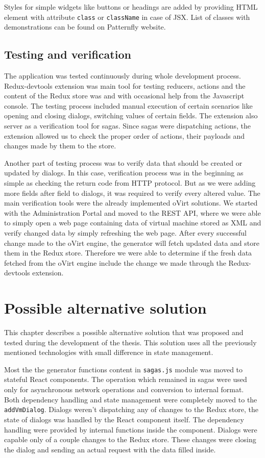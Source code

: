 Styles for simple widgets like buttons or headings are added by providing HTML element with attribute \texttt{class} or \texttt{className} in case of JSX. List of classes with demonstrations can be found on Patternfly website\cite{Patternfly}. 

\newpage
\section{Testing and verification}
The application was tested continuously during whole development process. Redux-devtools extension was main tool for testing reducers, actions and the content of the Redux store was and with occasional help from the Javascript console. The testing process included manual execution of certain scenarios like opening and closing dialogs, switching values of certain fields. The extension also server as a verification tool for sagas. Since sagas were dispatching actions, the extension allowed us to check the proper order of actions, their payloads and changes made by them to the store.

Another part of testing process was to verify data that should be created or updated by dialogs. In this case, verification process was in the beginning as simple as checking the return code from HTTP protocol. But as we were adding more fields after field to dialogs, it was required to verify every altered value. The main verification tools were the already implemented oVirt solutions. We started with the Administration Portal and moved to the REST API, where we were able to simply open a web page containing data of virtual machine stored as XML and verify changed data by simply refreshing the web page. After every successful change made to the oVirt engine, the generator will fetch updated data and store them in the Redux store. Therefore we were able to determine if the fresh data fetched from the oVirt engine include the change we made through the Redux-devtools extension.


\chapter{Possible alternative solution}
This chapter describes a possible alternative solution that was proposed and tested during the development of the thesis. This solution uses all the previously mentioned technologies with small difference in state management.

Most the the generator functions content in \texttt{sagas.js} module was moved to stateful React components. The operation which remained in sagas were used only for asynchronous network operations and conversion to internal format. Both dependency handling and state management were completely moved to the \texttt{addVmDialog}. Dialogs weren't dispatching any of changes to the Redux store, the state of dialogs was handled by the React component itself. The dependency handling were provided by internal functions inside the component. Dialogs were capable only of a couple changes to the Redux store. These changes were closing the dialog and sending an actual request with the data filled inside.

